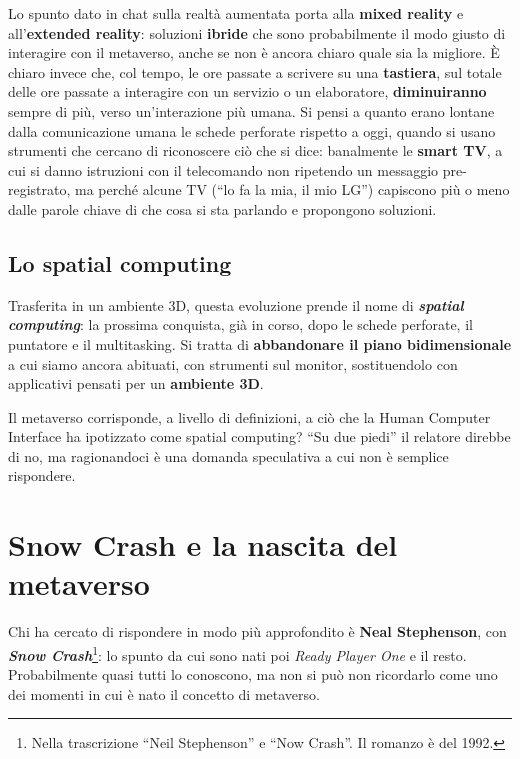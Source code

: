 Lo spunto dato in chat sulla realtà aumentata porta alla \textbf{mixed reality}
e all'\textbf{extended reality}: soluzioni \textbf{ibride} che sono probabilmente
il modo giusto di interagire con il metaverso, anche se non è ancora chiaro quale
sia la migliore. È chiaro invece che, col tempo, le ore passate a scrivere su una
\textbf{tastiera}, sul totale delle ore passate a interagire con un servizio o un
elaboratore, \textbf{diminuiranno} sempre di più, verso un'interazione più
umana. Si pensi a quanto erano lontane dalla comunicazione umana le schede
perforate rispetto a oggi, quando si usano strumenti che cercano di riconoscere
ciò che si dice: banalmente le \textbf{smart TV}, a cui si danno istruzioni con
il telecomando non ripetendo un messaggio pre-registrato, ma perché alcune TV
(``lo fa la mia, il mio LG'') capiscono più o meno dalle parole chiave di che
cosa si sta parlando e propongono soluzioni.

\subsection{Lo spatial computing}

Trasferita in un ambiente 3D, questa evoluzione prende il nome di
\textbf{\emph{spatial computing}}: la prossima conquista, già in corso, dopo le
schede perforate, il puntatore e il multitasking. Si tratta di
\textbf{abbandonare il piano bidimensionale} a cui siamo ancora abituati, con
strumenti sul monitor, sostituendolo con applicativi pensati per un
\textbf{ambiente 3D}.

Il metaverso corrisponde, a livello di definizioni, a ciò che la Human Computer
Interface ha ipotizzato come spatial computing? ``Su due piedi'' il relatore
direbbe di no, ma ragionandoci è una domanda speculativa a cui non è semplice
rispondere.

\section{Snow Crash e la nascita del metaverso}
\label{z8:sec:snow-crash}

Chi ha cercato di rispondere in modo più approfondito è \textbf{Neal
Stephenson}, con \emph{\textbf{Snow Crash}}\footnote{Nella trascrizione ``Neil
Stephenson'' e ``Now Crash''. Il romanzo è del 1992.}: lo spunto da cui sono nati
poi \emph{Ready Player One} e il resto. Probabilmente quasi tutti lo conoscono,
ma non si può non ricordarlo come uno dei momenti in cui è nato il concetto di
metaverso.

